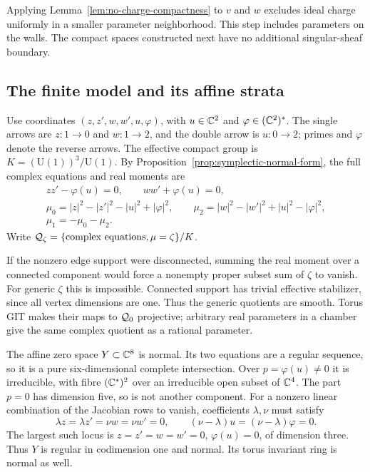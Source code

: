 Applying Lemma~\ref{lem:no-charge-compactness} to $v$
and $w$ excludes ideal charge uniformly in a smaller
parameter neighborhood. This step includes parameters on
the walls. The compact spaces constructed next have no
additional singular-sheaf boundary.

\subsection{The finite model and its affine strata}
Use coordinates $(z,z',w,w',u,\varphi)$, with
$u\in\mathbb C^2$ and $\varphi\in(\mathbb C^2)^*$. The single
arrows are $z:1\to0$ and $w:1\to2$, and the double
arrow is $u:0\to2$; primes and $\varphi$ denote the
reverse arrows. The effective compact group is
$K=(\mathrm U(1))^3/\mathrm U(1)$. By
Proposition~\ref{prop:symplectic-normal-form}, the full
complex equations and real moments are
\begin{equation}\label{eq:three-vertex-model}
 \begin{gathered}
 zz'-\varphi(u)=0,\qquad ww'+\varphi(u)=0,\\
 \mu_0=|z|^2-|z'|^2-|u|^2+|\varphi|^2,\qquad
 \mu_2=|w|^2-|w'|^2+|u|^2-|\varphi|^2,\\
 \mu_1=-\mu_0-\mu_2.
 \end{gathered}
\end{equation}
Write $\mathcal Q_\zeta=\{\text{complex equations},\mu=\zeta\}/K$.

If the nonzero edge support were disconnected, summing
the real moment over a connected component would force
a nonempty proper subset sum of $\zeta$ to vanish.
For generic $\zeta$ this is impossible. Connected
support has trivial effective stabilizer, since all
vertex dimensions are one. Thus the generic quotients
are smooth. Torus GIT makes their maps to $\mathcal Q_0$
projective; arbitrary real parameters in a chamber
give the same complex quotient as a rational parameter.

The affine zero space $Y\subset\mathbb C^8$ is normal.
Its two equations are a regular sequence, so it is
a pure six-dimensional complete intersection. Over
$p=\varphi(u)\ne0$ it is irreducible, with fibre
$(\mathbb C^*)^2$ over an irreducible open subset of $\mathbb C^4$.
The part $p=0$ has dimension five, so is not another
component. For a nonzero linear combination of the
Jacobian rows to vanish, coefficients $\lambda,\nu$
must satisfy
\[
 \lambda z=\lambda z'=\nu w=\nu w'=0,\qquad
 (\nu-\lambda)u=(\nu-\lambda)\varphi=0.
\]
The largest such locus is
$z=z'=w=w'=0$, $\varphi(u)=0$, of dimension three.
Thus $Y$ is regular in codimension one and normal.
Its torus invariant ring is normal as well.

